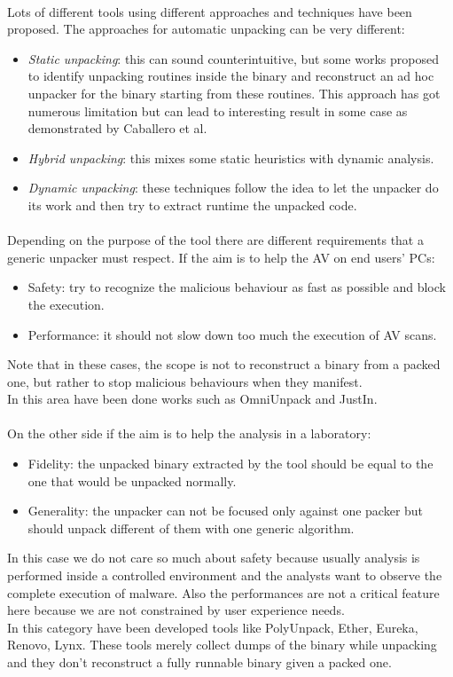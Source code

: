 \paragraph{}
Lots of different tools using different approaches and techniques have been proposed. 
The approaches for automatic unpacking can be very different:
\begin{itemize}
\item \textit{Static unpacking}: this can sound counterintuitive, but some works proposed to identify unpacking routines inside the binary and reconstruct an ad hoc unpacker for the binary starting from these routines. This approach has got numerous limitation but can lead to interesting result in some case as demonstrated by Caballero et al.
\item \textit{Hybrid unpacking}: this mixes some static heuristics with dynamic analysis.
\item \textit{Dynamic unpacking}: these techniques follow the idea to let the unpacker do its work and then try to extract runtime the unpacked code. 
\end{itemize}
\paragraph{}
Depending on the purpose of the tool there are different requirements that a generic unpacker must respect. If the aim is to help the AV on end users' PCs:
\begin{itemize}
\item Safety: try to recognize the malicious behaviour as fast as possible and block the execution. 
\item Performance: it should not slow down too much the execution of AV scans.
\end{itemize}
Note that in these cases, the scope is not to reconstruct a binary from a packed one, but rather to stop malicious behaviours when they manifest. \\
In this area have been done works such as OmniUnpack and JustIn.
\paragraph{}
On the other side if the aim is to help the analysis in a laboratory:
\begin{itemize}
\item Fidelity: the unpacked binary extracted by the tool should be equal to the one that would be unpacked normally. 
\item Generality: the unpacker can not be focused only against one packer but should unpack different of them with one generic algorithm.
\end{itemize}
In this case we do not care so much about safety because usually analysis is performed inside a controlled environment and the analysts want to observe the complete execution of malware. Also the performances are not a critical feature here because we are not constrained by user experience needs.\\
In this category have been developed tools like PolyUnpack, Ether, Eureka, Renovo, Lynx.
These tools merely collect dumps of the binary while unpacking and they don't reconstruct a fully runnable binary given a packed one.


